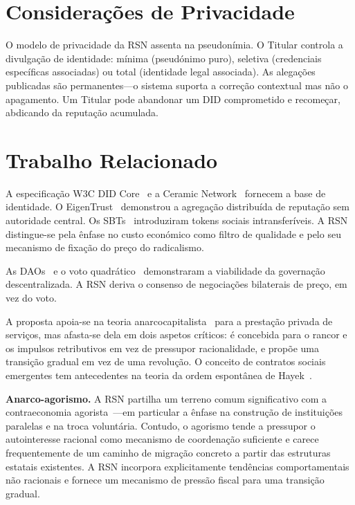 \documentclass[11pt,a4paper,twocolumn]{article}
\begin{document}
\section{Considerações de Privacidade}

O modelo de privacidade da RSN assenta na pseudonímia. O Titular controla a divulgação de identidade: mínima (pseudónimo puro), seletiva (credenciais específicas associadas) ou total (identidade legal associada). As alegações publicadas são permanentes---o sistema suporta a correção contextual mas não o apagamento. Um Titular pode abandonar um DID comprometido e recomeçar, abdicando da reputação acumulada.

\section{Trabalho Relacionado}

A especificação W3C DID Core~\cite{did2022} e a Ceramic Network~\cite{ceramic2023} fornecem a base de identidade. O EigenTrust~\cite{kamvar2003} demonstrou a agregação distribuída de reputação sem autoridade central. Os SBTs~\cite{weyl2022} introduziram tokens sociais intransferíveis. A RSN distingue-se pela ênfase no custo económico como filtro de qualidade e pelo seu mecanismo de fixação do preço do radicalismo.

As DAOs~\cite{buterin2014} e o voto quadrático~\cite{buterin2019} demonstraram a viabilidade da governação descentralizada. A RSN deriva o consenso de negociações bilaterais de preço, em vez do voto.

A proposta apoia-se na teoria anarcocapitalista~\cite{rothbard1973,hoppe2001} para a prestação privada de serviços, mas afasta-se dela em dois aspetos críticos: é concebida para o rancor e os impulsos retributivos em vez de pressupor racionalidade, e propõe uma transição gradual em vez de uma revolução. O conceito de contratos sociais emergentes tem antecedentes na teoria da ordem espontânea de Hayek~\cite{hayek1973}.

\textbf{Anarco-agorismo.} A RSN partilha um terreno comum significativo com a contraeconomia agorista~\cite{konkin2006}---em particular a ênfase na construção de instituições paralelas e na troca voluntária. Contudo, o agorismo tende a pressupor o autointeresse racional como mecanismo de coordenação suficiente e carece frequentemente de um caminho de migração concreto a partir das estruturas estatais existentes. A RSN incorpora explicitamente tendências comportamentais não racionais e fornece um mecanismo de pressão fiscal para uma transição gradual.
\end{document}
